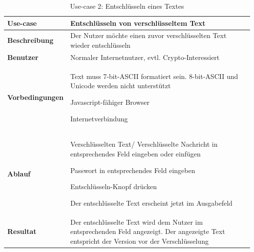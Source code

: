 \documentclass[11pt,paper=a4,final]{scrartcl}
\begin{document}
\begin{table}[h!]
  \centering
  \begin{tabular}{|l|p{12cm}|}\hline
    \bf Use-case & \bf Entschl\"usseln von verschl\"usseltem Text \\ \hline
    \bf Beschreibung & Der Nutzer m\"ochte einen zuvor verschl\"usselten Text
    wieder entschl\"usseln \\ \hline
    \bf Benutzer & Normaler Internetnutzer, evtl. Crypto-Interessiert \\ \hline
    \bf Vorbedingungen & \begin{itemize*} \item Text muss 7-bit-ASCII formatiert
    sein. 8-bit-ASCII und Unicode werden nicht unterst\"utzt \item
    Javascript-f\"ahiger Browser \item Internetverbindung \end{itemize*} \\
    \hline
    \bf Ablauf & \begin{itemize*} \item Verschl\"usselten Text/ Verschl\"usselte
    Nachricht in entsprechendes Feld eingeben
    oder einf\"ugen \item Passwort in entsprechendes Feld eingeben \item
    Entschl\"usseln-Knopf dr\"ucken \item Der entschl\"usselte Text erscheint
    jetzt im Ausgabefeld \end{itemize*} \\ \hline
    \bf Resultat & Der entschl\"usselte Text wird dem Nutzer im entsprechenden
    Feld angezeigt. Der angezeigte Text entspricht der Version vor der
    Verschl\"usselung \\ \hline
  \end{tabular}
  \caption{Use-case 2: Entschl\"usseln eines Textes}
  \label{tab:usecase2}
\end{table}
\end{document}

